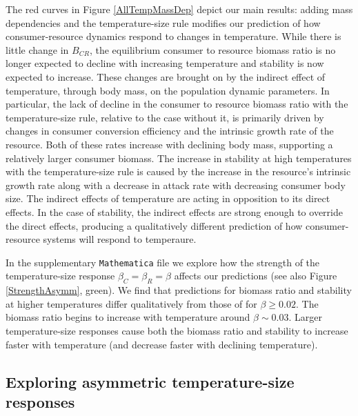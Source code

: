 \documentclass[11pt]{article}
\begin{document}
The red curves in Figure \ref{AllTempMassDep} depict our main results: adding mass dependencies and the temperature-size rule modifies our prediction of how consumer-resource dynamics respond to changes in temperature.
While there is little change in $B_{CR}$, the equilibrium consumer to resource biomass ratio is no longer expected to decline with increasing temperature and stability is now expected to increase.
These changes are brought on by the indirect effect of temperature, through body mass, on the population dynamic parameters.
In particular, the lack of decline in the consumer to resource biomass ratio with the temperature-size rule, relative to the case without it, is primarily driven by changes in consumer conversion efficiency and the intrinsic growth rate of the resource.
Both of these rates increase with declining body mass, supporting a relatively larger consumer biomass. 
The increase in stability at high temperatures with the temperature-size rule is caused by the increase in the resource's intrinsic growth rate along with a decrease in attack rate with decreasing consumer body size. 
%
%
The indirect effects of temperature are acting in opposition to its direct effects.
In the case of stability, the indirect effects are strong enough to override the direct effects, producing a qualitatively different prediction of how consumer-resource systems will respond to temperaure.

In the supplementary \texttt{Mathematica} file we explore how the strength of the temperature-size response $\beta_C = \beta_R = \beta$ affects our predictions (see also Figure \ref{StrengthAsymm}, green). 
We find that predictions for biomass ratio and stability at higher temperatures differ qualitatively from those of \cite{Gilbert2014} for $\beta\geq0.02$.
The biomass ratio begins to increase with temperature around $\beta\sim0.03$.
Larger temperature-size responses cause both the biomass ratio and stability to increase faster with temperature (and decrease faster with declining temperature).

\subsection*{Exploring asymmetric temperature-size responses}
\end{document}
